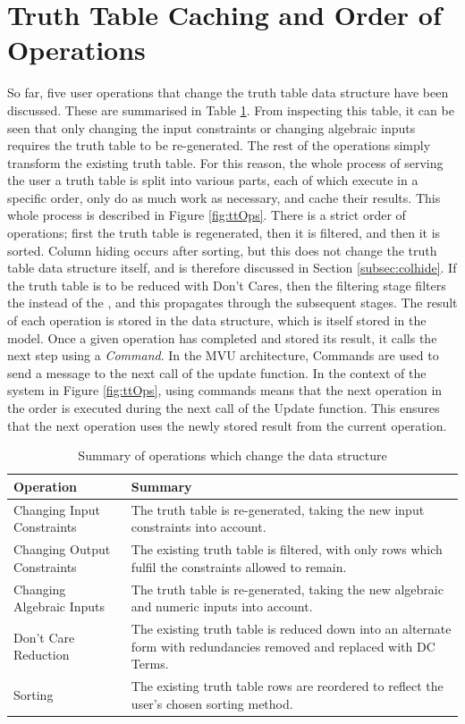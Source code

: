 \section{Truth Table Caching and Order of Operations} \label{sec:cachingTT}
So far, five user operations that change the truth table data structure have been discussed. These are summarised in Table \ref{tab:ttOps}. From inspecting this table, it can be seen that only changing the input constraints or changing algebraic inputs requires the truth table to be re-generated. The rest of the operations simply transform the existing truth table. For this reason, the whole process of serving the user a truth table is split into various parts, each of which execute in a specific order, only do as much work as necessary, and cache their results. This whole process is described in Figure \ref{fig:ttOps}. There is a strict order of operations; first the truth table is regenerated, then it is filtered, and then it is sorted. Column hiding occurs after sorting, but this does not change the truth table data structure itself, and is therefore discussed in Section \ref{subsec:colhide}. If the truth table is to be reduced with Don't Cares, then the filtering stage filters the  instead of the , and this propagates through the subsequent stages. The result of each operation is stored in the  data structure, which is itself stored in the model. Once a given operation has completed and stored its result, it calls the next step using a \textit{Command}. In the MVU architecture, Commands are used to send a message to the next call of the update function. In the context of the system in Figure \ref{fig:ttOps}, using commands means that the next operation in the order is executed during the next call of the Update function. This ensures that the next operation uses the newly stored result from the current operation. 

\begin{table}[!ht]
    \centering
    \begin{tabular}{|p{4cm}|p{9cm}|}
    \hline
        \textbf{Operation} & \textbf{Summary} \\ \hline
        Changing Input Constraints & The truth table is re-generated, taking the new input constraints into account. \\ \hline
        Changing Output Constraints & The existing truth table is filtered, with only rows which fulfil the constraints allowed to remain. \\ \hline
        Changing Algebraic Inputs & The truth table is re-generated, taking the new algebraic and numeric inputs into account. \\ \hline
        Don't Care Reduction & The existing truth table is reduced down into an alternate form with redundancies removed and replaced with DC Terms. \\ \hline
        Sorting & The existing truth table rows are reordered to reflect the user's chosen sorting method. \\ \hline
    \end{tabular}
    \caption{Summary of operations which change the  data structure}
    \label{tab:ttOps}
\end{table}

